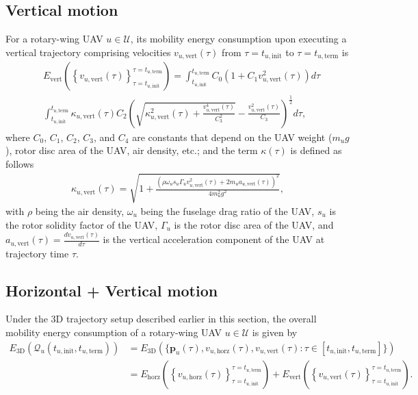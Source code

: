 \documentclass{article}
\begin{document}
\subsection{Vertical motion}
For a rotary-wing UAV $u{\in}\mathcal{U}$, its mobility energy consumption upon executing a vertical trajectory comprising velocities $v_{u,\mathrm{vert}}(\tau)$ from $\tau{=}t_{u,\mathrm{init}}$ to $\tau{=}t_{u,\mathrm{term}}$ is
\begin{align}\label{Vertical_energy}
    &E_{\mathrm{vert}}\left(\left\{v_{u,\mathrm{vert}}(\tau)\right\}_{\tau{=}t_{u,\mathrm{init}}}^{\tau{=}t_{u,\mathrm{term}}}\right){=}\int_{t_{u,\mathrm{init}}}^{t_{u,\mathrm{term}}}C_{0}\left(1{+}C_{1}v_{u,\mathrm{vert}}^{2}(\tau)\right)d\tau\\&\int_{t_{u,\mathrm{init}}}^{t_{u,\mathrm{term}}}\kappa_{u,\mathrm{vert}}(\tau)C_{2}\left(\sqrt{\kappa_{u,\mathrm{vert}}^{2}(\tau){+}\frac{v_{u,\mathrm{vert}}^{4}(\tau)}{C_{3}^{2}}}{-}\frac{v_{u,\mathrm{vert}}^{2}(\tau)}{C_{3}}\right)^{\frac{1}{2}}d\tau\nonumber,
\end{align}
where $C_{0}$, $C_{1}$, $C_{2}$, $C_{3}$, and $C_{4}$ are constants that depend on the UAV weight ($m_{u}g$), rotor disc area of the UAV, air density, etc.; and the term $\kappa(\tau)$ is defined as follows
\begin{align}\label{Kappa_term_vert}
    \kappa_{u,\mathrm{vert}}(\tau){=}\sqrt{1{+}\frac{\left(\rho\omega_{u}s_{u}\Gamma_{u}v_{u,\mathrm{vert}}^{2}(\tau){+}2m_{u}a_{u,\mathrm{vert}}(\tau)\right)^{2}}{4m_{u}^{2}g^{2}}},
\end{align}
with $\rho$ being the air density, $\omega_{u}$ being the fuselage drag ratio of the UAV, $s_{u}$ is the rotor solidity factor of the UAV, $\Gamma_{u}$ is the rotor disc area of the UAV, and $a_{u,\mathrm{vert}}(\tau){=}\frac{dv_{u,\mathrm{vert}}(\tau)}{d\tau}$ is the vertical acceleration component of the UAV at trajectory time $\tau$.

\subsection{Horizontal + Vertical motion}
Under the $3$D trajectory setup described earlier in this section, the overall mobility energy consumption of a rotary-wing UAV $u{\in}\mathcal{U}$ is given by
\begin{align}\label{3D_energy}
    E_{\mathrm{3D}}\left(\mathcal{Q}_{u}\left(t_{u,\mathrm{init}},t_{u,\mathrm{term}}\right)\right)&{=}E_{\mathrm{3D}}\left(\Big\{\mathbf{p}_{u}(\tau),v_{u,\mathrm{horz}}(\tau),v_{u,\mathrm{vert}}(\tau): \tau{\in}\left[t_{u,\mathrm{init}},t_{u,\mathrm{term}}\right]\Big\}\right)\\&{=}E_{\mathrm{horz}}\left(\left\{v_{u,\mathrm{horz}}(\tau)\right\}_{\tau{=}t_{u,\mathrm{init}}}^{\tau{=}t_{u,\mathrm{term}}}\right){+}E_{\mathrm{vert}}\left(\left\{v_{u,\mathrm{vert}}(\tau)\right\}_{\tau{=}t_{u,\mathrm{init}}}^{\tau{=}t_{u,\mathrm{term}}}\right)\nonumber.
\end{align}
\end{document}
